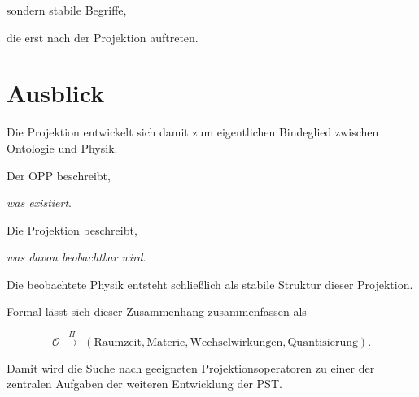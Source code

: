 sondern stabile Begriffe,

die erst nach der Projektion auftreten.

\section*{Ausblick}

Die Projektion entwickelt sich damit zum eigentlichen Bindeglied zwischen Ontologie und Physik.

Der OPP beschreibt,

\emph{was existiert}.

Die Projektion beschreibt,

\emph{was davon beobachtbar wird}.

Die beobachtete Physik entsteht schließlich als stabile Struktur dieser Projektion.

Formal lässt sich dieser Zusammenhang zusammenfassen als

\[
\boxed{
\mathcal{O}
\;
\overset{\Pi}{\longrightarrow}
\;
(\text{Raumzeit},
\text{Materie},
\text{Wechselwirkungen},
\text{Quantisierung}).
}
\]

Damit wird die Suche nach geeigneten Projektionsoperatoren zu einer der zentralen Aufgaben der weiteren Entwicklung der PST.

